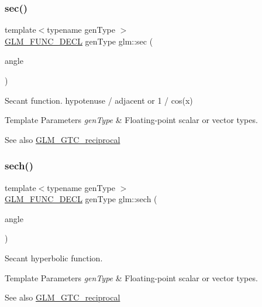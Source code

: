 \subsubsection{\texorpdfstring{sec()}{sec()}}
{\footnotesize\ttfamily template$<$typename gen\+Type $>$ \\
\mbox{\hyperlink{setup_8hpp_ab2d052de21a70539923e9bcbf6e83a51}{G\+L\+M\+\_\+\+F\+U\+N\+C\+\_\+\+D\+E\+CL}} gen\+Type glm\+::sec (\begin{DoxyParamCaption}\item[{gen\+Type}]{angle }\end{DoxyParamCaption})}

Secant function. hypotenuse / adjacent or 1 / cos(x)


\begin{DoxyTemplParams}{Template Parameters}
{\em gen\+Type} & Floating-\/point scalar or vector types.\\
\hline
\end{DoxyTemplParams}
\begin{DoxySeeAlso}{See also}
\mbox{\hyperlink{group__gtc__reciprocal}{G\+L\+M\+\_\+\+G\+T\+C\+\_\+reciprocal}} 
\end{DoxySeeAlso}
\mbox{\label{group__gtc__reciprocal_ga9a5cfd1e7170104a7b33863b1b75e5ae}} 
\subsubsection{\texorpdfstring{sech()}{sech()}}
{\footnotesize\ttfamily template$<$typename gen\+Type $>$ \\
\mbox{\hyperlink{setup_8hpp_ab2d052de21a70539923e9bcbf6e83a51}{G\+L\+M\+\_\+\+F\+U\+N\+C\+\_\+\+D\+E\+CL}} gen\+Type glm\+::sech (\begin{DoxyParamCaption}\item[{gen\+Type}]{angle }\end{DoxyParamCaption})}

Secant hyperbolic function.


\begin{DoxyTemplParams}{Template Parameters}
{\em gen\+Type} & Floating-\/point scalar or vector types.\\
\hline
\end{DoxyTemplParams}
\begin{DoxySeeAlso}{See also}
\mbox{\hyperlink{group__gtc__reciprocal}{G\+L\+M\+\_\+\+G\+T\+C\+\_\+reciprocal}} 
\end{DoxySeeAlso}
